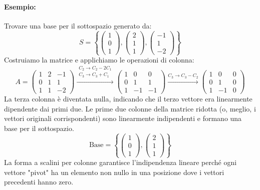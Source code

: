 \documentclass{article}
\begin{document}
\paragraph{Esempio:} Trovare una base per il sottospazio generato da:
\[ S = \left\{ \begin{pmatrix} 1 \\ 0 \\ 1 \end{pmatrix}, \begin{pmatrix} 2 \\ 1 \\ 1 \end{pmatrix}, \begin{pmatrix} -1 \\ 1 \\ -2 \end{pmatrix} \right\} \]
Costruiamo la matrice e applichiamo le operazioni di colonna:
\[
A = \begin{pmatrix}
1 & 2 & -1 \\
0 & 1 & 1 \\
1 & 1 & -2
\end{pmatrix}
\xrightarrow{\substack{C_2 \to C_2 - 2C_1 \\ C_3 \to C_3 + C_1}}
\begin{pmatrix}
1 & 0 & 0 \\
0 & 1 & 1 \\
1 & -1 & -1
\end{pmatrix}
\xrightarrow{C_3 \to C_3 - C_2}
\begin{pmatrix}
1 & 0 & 0 \\
0 & 1 & 0 \\
1 & -1 & 0
\end{pmatrix}
\]
La terza colonna è diventata nulla, indicando che il terzo vettore era linearmente dipendente dai primi due. Le prime due colonne della matrice ridotta (o, meglio, i vettori originali corrispondenti) sono linearmente indipendenti e formano una base per il sottospazio.
\[ \text{Base} = \left\{ \begin{pmatrix} 1 \\ 0 \\ 1 \end{pmatrix}, \begin{pmatrix} 2 \\ 1 \\ 1 \end{pmatrix} \right\} \]
La forma a scalini per colonne garantisce l'indipendenza lineare perché ogni vettore "pivot" ha un elemento non nullo in una posizione dove i vettori precedenti hanno zero.
\end{document}
